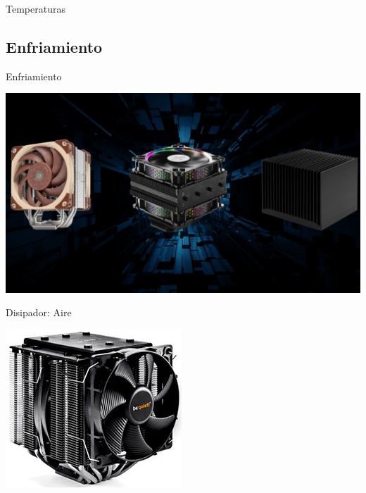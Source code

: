 \documentclass[10pt,xcolor={dvipsnames}]{beamer}
\begin{document}
\begin{frame}{Temperaturas}
\begin{center}
\end{center}
\end{frame}


\subsection{Enfriamiento}
\begin{frame}{Enfriamiento}
\begin{center}
\includegraphics[scale=0.3]{Figures/disipadores}
\end{center}
\end{frame}

\begin{frame}{Disipador: Aire}
\begin{center}
\includegraphics[scale=0.5]{Figures/disipadorAire}
\end{center}
\end{frame}
\end{document}
